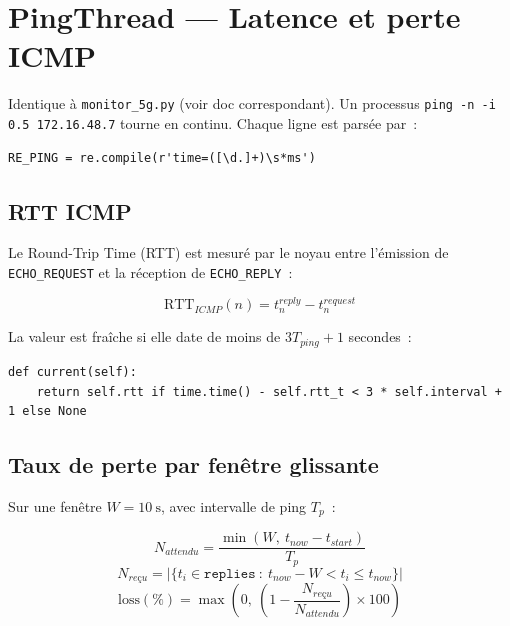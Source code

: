 \documentclass[a4paper,12pt]{article}
\begin{document}
\section{PingThread — Latence et perte ICMP}

Identique à \texttt{monitor\_5g.py} (voir doc correspondant). Un processus
\texttt{ping -n -i 0.5 172.16.48.7} tourne en continu. Chaque ligne est parsée par~:

\begin{lstlisting}
RE_PING = re.compile(r'time=([\d.]+)\s*ms')
\end{lstlisting}

\subsection{RTT ICMP}

Le Round-Trip Time (RTT) est mesuré par le noyau entre l'émission de \texttt{ECHO\_REQUEST}
et la réception de \texttt{ECHO\_REPLY}~:

\begin{equation}
  \text{RTT}_{ICMP}(n) = t^{reply}_n - t^{request}_n
\end{equation}

La valeur est fraîche si elle date de moins de $3 T_{ping} + 1$ secondes~:
\begin{lstlisting}
def current(self):
    return self.rtt if time.time() - self.rtt_t < 3 * self.interval + 1 else None
\end{lstlisting}

\subsection{Taux de perte par fenêtre glissante}

Sur une fenêtre $W = 10\ \text{s}$, avec intervalle de ping $T_p$~:

\begin{equation}
  N_{attendu} = \frac{\min(W,\ t_{now} - t_{start})}{T_p}
\end{equation}
\begin{equation}
  N_{reçu} = \bigl|\{t_i \in \texttt{replies}\ :\ t_{now} - W < t_i \leq t_{now}\}\bigr|
\end{equation}
\begin{equation}
  \boxed{\text{loss}(\%) = \max\!\left(0,\ \left(1 - \frac{N_{reçu}}{N_{attendu}}\right) \times 100\right)}
\end{equation}
\end{document}
